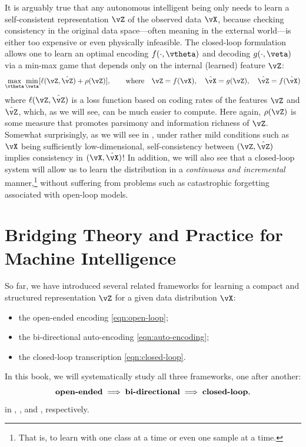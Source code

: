 \documentclass[../../book-main.tex]{subfiles}
\begin{document}
It is arguably true that any autonomous intelligent being only needs
to learn a self-consistent representation \(\vZ\) of the observed
data \(\vX\), because checking consistency in the original data
space---often meaning in the external world---is either too expensive
or even physically infeasible. The closed-loop formulation allows one
to learn an optimal encoding \(f(\cdot, \vtheta)\) and decoding
\(g(\cdot, \veta)\) via a min-max game that depends only on the
internal (learned) feature \(\vZ\):
\begin{equation}
    \max_{\vtheta}\min_{\veta} [\ell( \vZ, \hat{\vZ}) + \rho(\vZ)],
    \qquad \text{where} \quad \vZ = f(\vX), \quad \hat{\vX} = g(\vZ),
    \quad \hat{\vZ} = f(\hat{\vX})
    \label{eqn:closed-loop-objective}
\end{equation}
where \(\ell( \vZ, \hat{\vZ})\) is a loss function based on coding
rates of the features \(\vZ\) and \(\hat{\vZ}\), which, as we will
see, can be much easier to compute. Here again, \(\rho(\vZ)\) is some
measure that promotes parsimony and information richness of \(\vZ\).
Somewhat surprisingly, as we will see in
, under
rather mild conditions such as \(\vX\) being sufficiently
low-dimensional, self-consistency between \((\vZ, \hat{\vZ})\)
implies consistency in \((\vX, \hat{\vX})\)! In addition, we will
also see that a closed-loop system will allow us to learn the
distribution in a \textit{continuous and incremental}
manner,\footnote{That is, to learn with one class at a time or even
one sample at a time.} without suffering from problems such as
catastrophic forgetting associated with open-loop models.

\section{Bridging Theory and Practice for Machine Intelligence}
So far, we have introduced several related frameworks for learning a
compact and structured representation \(\vZ\) for a given data
distribution \(\vX\):
\begin{itemize}
    \item the open-ended encoding \eqref{eqn:open-loop};
    \item the bi-directional auto-encoding \eqref{eqn:auto-encoding};
    \item the closed-loop transcription \eqref{eqn:closed-loop}.
\end{itemize}
In this book, we will systematically study all three frameworks, one
after another:
\begin{equation}
    \text{\textbf{open-ended}} \; \Longrightarrow \;
    \text{\textbf{bi-directional}} \; \Longrightarrow \;
    \text{\textbf{closed-loop}},
\end{equation}
in , ,
and , respectively.
\end{document}
